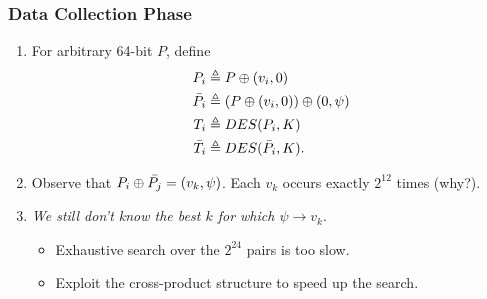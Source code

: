 \documentclass{beamer}
\begin{document}
    \begin{frame}
        \frametitle{Data Collection Phase}
        \begin{enumerate}
            \item<1-> For arbitrary 64-bit \(P\), define
            \begin{align}
                P_i &\triangleq P \oplus (v_i, 0) \\
                \bar{P_i} &\triangleq (P \oplus (v_i, 0)) \oplus (0, \psi) \\
                T_i &\triangleq DES(P_i, K) \\
                \bar{T_i} &\triangleq DES(\bar{P_i}, K).
                \label{eq:pi-ti-def}
            \end{align}
            \item<2-> Observe that \(P_i \oplus \bar{P_j} = (v_k, \psi)\).
            Each \(v_k\) occurs exactly \(2^{12}\) times (why?).
            \item<3-> \emph{We still don't know the best \(k\) for which \(\psi
            \rightarrow v_k\)}.
            \begin{itemize}
                \item<4-> Exhaustive search over the \(2^{24}\) pairs is too
                slow.
                \item<5-> Exploit the cross-product structure to speed up the
                search.
            \end{itemize}
        \end{enumerate}
    \end{frame}
\end{document}
